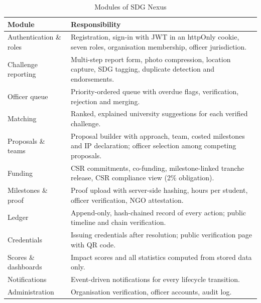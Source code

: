 \begin{table}[H]
\centering
\caption{Modules of SDG Nexus}
\label{tab:modules}
\small
\begin{tabularx}{\textwidth}{@{}L{3.6cm}X@{}}
\toprule
\textbf{Module} & \textbf{Responsibility} \\
\midrule
Authentication \& roles & Registration, sign-in with JWT in an httpOnly cookie, seven roles, organisation membership, officer jurisdiction. \\
Challenge reporting & Multi-step report form, photo compression, location capture, SDG tagging, duplicate detection and endorsements. \\
Officer queue & Priority-ordered queue with overdue flags, verification, rejection and merging. \\
Matching & Ranked, explained university suggestions for each verified challenge. \\
Proposals \& teams & Proposal builder with approach, team, costed milestones and IP declaration; officer selection among competing proposals. \\
Funding & CSR commitments, co-funding, milestone-linked tranche release, CSR compliance view (2\% obligation). \\
Milestones \& proof & Proof upload with server-side hashing, hours per student, officer verification, NGO attestation. \\
Ledger & Append-only, hash-chained record of every action; public timeline and chain verification. \\
Credentials & Issuing credentials after resolution; public verification page with QR code. \\
Scores \& dashboards & Impact scores and all statistics computed from stored data only. \\
Notifications & Event-driven notifications for every lifecycle transition. \\
Administration & Organisation verification, officer accounts, audit log. \\
\bottomrule
\end{tabularx}
\end{table}


